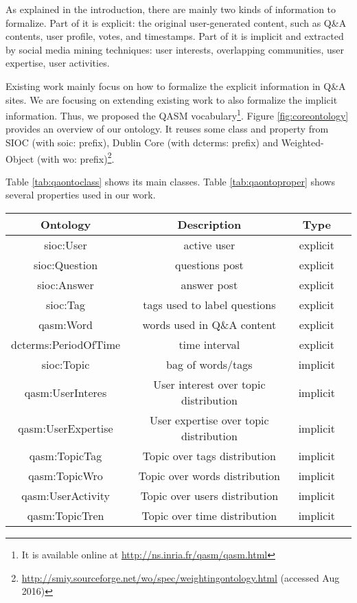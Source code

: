 As explained in the introduction, there are mainly two kinds of information to formalize. Part of it is explicit: the original user-generated content, such as Q\&A contents, user profile, votes, and timestamps. Part of it is implicit and extracted by social media mining techniques: user interests, overlapping communities, user expertise, user activities. 

Existing work mainly focus on how to formalize the explicit information in Q\&A sites. We are focusing on extending existing work to also formalize the implicit information. Thus, we proposed the QASM vocabulary\footnote{It is available online at \url{http://ns.inria.fr/qasm/qasm.html}}. Figure \ref{fig:coreontology} provides an overview of our ontology.
It reuses some class and property from SIOC (with soic: prefix), Dublin Core (with dcterms: prefix) and Weighted-Object (with wo: prefix)\footnote{\url{http://smiy.sourceforge.net/wo/spec/weightingontology.html} (accessed Aug 2016)}. 

Table \ref{tab:qaontoclass} shows its main classes.
Table \ref{tab:qaontoproper} shows several properties used in our work. 

\begin{sidewaystable}
    \centering
    \begin{tabular}{|c|c|c|c|}
    \hline
Ontology&  Description & Type  \\ \hline
  sioc:User& active user & explicit  \\ \hline
 sioc:Question& questions post & explicit  \\ \hline
 sioc:Answer& answer post & explicit  \\ \hline
 sioc:Tag& tags used to label questions & explicit  \\ \hline
 qasm:Word& words used in Q\&A content  &explicit\\ \hline
 dcterms:PeriodOfTime& time interval & explicit  \\ \hline
 sioc:Topic& bag of words/tags & implicit  \\ \hline
 qasm:UserInteres& User interest over topic distribution & implicit \\ \hline
 qasm:UserExpertise& User expertise over topic distribution &implicit \\ \hline
qasm:TopicTag&Topic over tags distribution&implicit  \\ \hline
 qasm:TopicWro&Topic over words distribution &implicit  \\ \hline
qasm:UserActivity&Topic over users distribution & implicit  \\ \hline
 qasm:TopicTren&Topic over time distribution &implicit  \\ \hline
          
    \end{tabular}
    \caption{the Vocabulary (classes) used in our work}
    \label{tab:qaontoclass}
\end{sidewaystable}


